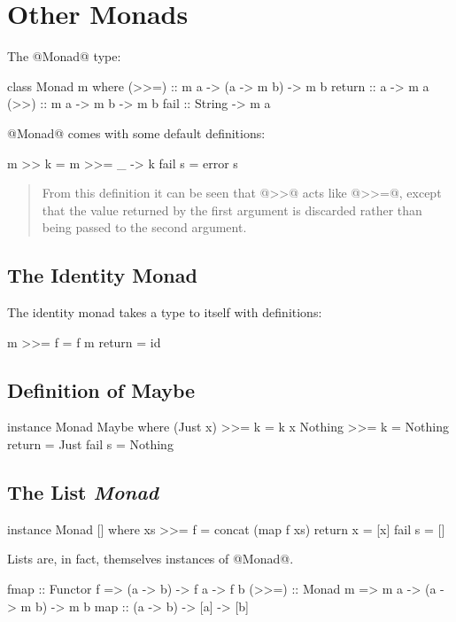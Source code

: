 \chapter{Other Monads}

The @Monad@ type\autocite[p.~402]{thompson:99}:

\begin{code}
class Monad m where
  (>>=)  :: m a -> (a -> m b) -> m b
  return :: a -> m a
  (>>)   :: m a -> m b -> m b
  fail   :: String -> m a
\end{code}

@Monad@ comes with some default definitions:

\begin{code}
  m >> k = m >>= \_ -> k
  fail s = error s
\end{code}

\begin{quote}
From this definition it can be seen that @>>@ acts like @>>=@, except that the
value returned by the first argument is discarded rather than being passed to
the second argument. \autocite[p.~403]{thompson:99}
\end{quote}

\section{The Identity Monad}

The identity monad \autocite[p.~404]{thompson:99} takes a type to itself with
definitions:

\begin{code}
  m >>= f = f m
  return  = id
\end{code}

\section{Definition of Maybe}

\begin{code}
instance Monad Maybe where
  (Just x) >>= k  = k x
  Nothing >>= k   = Nothing
  return          = Just
  fail s          = Nothing
\end{code}

\section{The List \textit{Monad}}

\begin{code}
instance Monad [] where
  xs >>= f = concat (map f xs)
  return x = [x]
  fail s = []
\end{code}

Lists are, in fact, themselves instances of @Monad@.

\begin{code}
fmap  :: Functor f => (a -> b) -> f a -> f b
(>>=) :: Monad   m => m a -> (a -> m b) -> m b
map   :: (a -> b) -> [a] -> [b]
\end{code}
